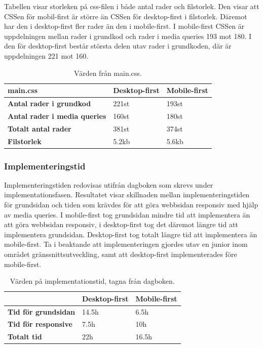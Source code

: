 \documentclass[11pt]{article}
\begin{document}
Tabellen visar storleken på css-filen i både antal rader och filstorlek. Den visar att CSSen för mobil-first är större än CSSen för desktop-first i filstorlek. Däremot har den i desktop-first fler rader än den i mobile-first. I mobile-first CSSen är uppdelningen mellan rader i grundkod och rader i media queries 193 mot 180. I den för desktop-first består största delen utav rader i grundkoden, där är uppdelningen 221 mot 160.

\begin{table}[H]
	\centering
	\begin{tabular}{|p{6cm}|p{2.7cm}|p{2.4cm}|}
	\hline
	\textbf{main.css}&\textbf{Desktop-first}&\textbf{Mobile-first}\\ \hline
	\textbf{Antal rader i grundkod}&221st&193st\\ \hline
	\textbf{Antal rader i media queries}&160st&180st\\ \hline
	\textbf{Totalt antal rader}&381st&374st\\ \hline
	\textbf{Filstorlek}&5.2kb&5.6kb\\ \hline
	\end{tabular}
    \caption {Värden från main.css.}
\end{table}

\subsubsection{Implementeringstid}

Implementeringstiden redovisas utifrån dagboken som skrevs under implementationsfasen. Resultatet visar skillnaden mellan implementeringstiden för grundsidan och tiden som krävdes för att göra webbsidan responsiv med hjälp av media queries. I mobile-first tog grundsidan mindre tid att implementera än att göra webbsidan responsiv, i desktop-first tog det däremot längre tid att implementera grundsidan. Desktop-first tog totalt längre tid att implementera än mobile-first. Ta i beaktande att implementeringen gjordes utav en junior inom området gränssnittsutveckling, samt att desktop-first implementerades före mobile-first.

\begin{table}[H]
	\centering
	\begin{tabular}{|p{6cm}|p{2.7cm}|p{2.4cm}|}
	\hline
	~&\textbf{Desktop-first}&\textbf{Mobile-first}\\ \hline
	\textbf{Tid för grundsidan}&14.5h&6.5h\\ \hline
	\textbf{Tid för responsive}&7.5h&10h\\ \hline
	\textbf{Totalt tid}&22h&16.5h\\ \hline
	\end{tabular}
    \caption {Värden på implementationstid, tagna från dagboken.}
\end{table}
\end{document}
